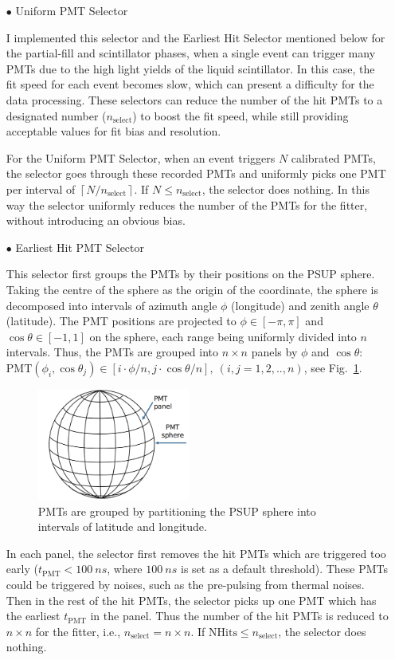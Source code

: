 \begin{itemize}
	\item[$\bullet$] Uniform PMT Selector
	
	I implemented this selector and the Earliest Hit Selector mentioned below for the partial-fill and scintillator phases, when a single event can trigger many PMTs due to the high light yields of the liquid scintillator. In this case, the fit speed for each event becomes slow, which can present a difficulty for the data processing. These selectors can reduce the number of the hit PMTs to a designated number ($n_\mathrm{select}$) to boost the fit speed, while still providing acceptable values for fit bias and resolution. 
	
	For the Uniform PMT Selector, when an event triggers $N$ calibrated PMTs, the selector goes through these recorded PMTs and uniformly picks one PMT per interval of $\left \lceil{N/n_\mathrm{select}}\right \rceil $. If $N\leq n_\mathrm{select}$, the selector does nothing. In this way the selector uniformly reduces the number of the PMTs for the fitter, without introducing an obvious bias.
	
	\item[$\bullet$] Earliest Hit PMT Selector
	
	This selector first groups the PMTs by their positions on the PSUP sphere. Taking the centre of the sphere as the origin of the coordinate, the sphere is decomposed into intervals of azimuth angle $\phi$ (longitude) and zenith angle $\theta$ (latitude). The PMT positions are projected to $\phi\in [-\pi,\pi]$ and $\cos\theta\in [-1, 1]$ on the sphere, each range being uniformly divided into $n$ intervals. Thus, the PMTs are grouped into $n\times n$ panels by $\phi$ and $\cos\theta$: $\mathrm{PMT}(\phi_i,\cos\theta_j) \in [i\cdot\phi/n, j\cdot\cos\theta/n],~(i,j=1,2,..,n)$, see Fig.~\ref{GroupPMTs}. 
	\begin{figure}[!htb]
		\centering
		\includegraphics[width=5cm]{GroupPMTs.png}
		\caption{PMTs are grouped by partitioning the PSUP sphere into intervals of latitude and longitude.}
		\label{GroupPMTs}
	\end{figure}
	
	In each panel, the selector first removes the hit PMTs which are triggered too early ($t_\mathrm{PMT}<100~ns$, where $100~ns$ is set as a default threshold). These PMTs could be triggered by noises, such as the pre-pulsing from thermal noises. Then in the rest of the hit PMTs, the selector picks up one PMT which has the earliest $t_\mathrm{PMT}$ in the panel. Thus the number of the hit PMTs is reduced to $n\times n$ for the fitter, i.e., $n_\mathrm{select}=n\times n$. If $\mathrm{NHits}\leq n_\mathrm{select}$, the selector does nothing. 
	

\end{itemize}
